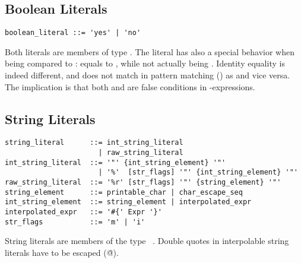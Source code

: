 \subsection{Boolean Literals}
\label{sec:booleanliterals}

\syntax\begin{lstlisting}
boolean_literal ::= 'yes' | 'no'
\end{lstlisting}

Both literals are members of type \lstinline@Boolean@. The \lstinline@no@ literal has also a special behavior when being compared to \lstinline@nil@: \lstinline@no@ equals to \lstinline@nil@, while not actually being \lstinline@nil@. Identity equality is indeed different, and  does not match in pattern matching () as  and vice versa. The implication is that both \lstinline@nil@ and \lstinline@no@ are false conditions in \lstinline@if@-expressions. 





\subsection{String Literals}
\label{sec:stringliterals}

\syntax\begin{lstlisting}
string_literal      ::= int_string_literal
                      | raw_string_literal
int_string_literal  ::= '"' {int_string_element} '"'
                      | '%'  [str_flags] '"' {int_string_element} '"'
raw_string_literal  ::= '%r' [str_flags] '"' {string_element} '"'
string_element      ::= printable_char | char_escape_seq
int_string_element  ::= string_element | interpolated_expr
interpolated_expr   ::= '#{' Expr '}'
str_flags           ::= 'm' | 'i'
\end{lstlisting}

String literals are members of the type ~\lstinline@String@. Double quotes in interpolable string literals have to be escaped (\lstinline@\"@).

